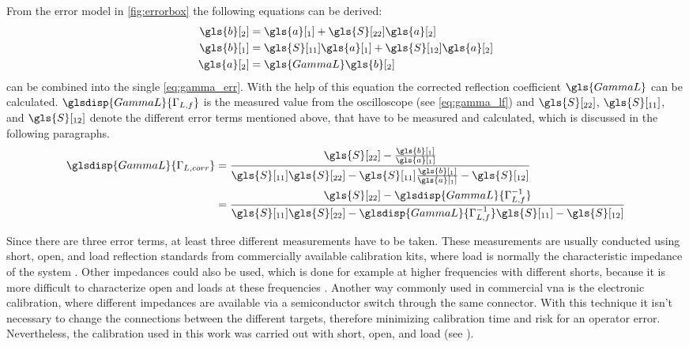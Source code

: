 \documentclass[12pt,a4paper,parskip=full,abstract=true,BCOR=12mm,twoside,open=right]{scrreprt}
\begin{document}
From the error model in \cref{fig:errorbox} the following equations can be derived:
\begin{align}
    \label{eq:b2} \gls{b}[_{2}] & = \gls{a}[_{1}] + \gls{S}[_{22}] \gls{a}[_{2}]\\
    \label{eq:b1} \gls{b}[_{1}] & = \gls{S}[_{11}] \gls{a}[_{1}] + \gls{S}[_{12}] \gls{a}[_{2}] \\
    \label{eq:a2} \gls{a}[_{2}] & = \gls{GammaL} \gls{b}[_{2}]
\end{align}
 can be combined into the single \cref{eq:gamma_err}.
With the help of this equation the corrected reflection coefficient $\gls{GammaL}$ can be calculated.
$\glsdisp{GammaL}{\Gamma_{L,f}}$ is the measured value from the oscilloscope (see \cref{eq:gamma_lf}) and $\gls{S}[_{22}]$, $\gls{S}[_{11}]$, and $\gls{S}[_{12}]$ denote the different
error terms mentioned above, that have to be measured and calculated, which is discussed in the following paragraphs.
\begin{equation}\label{eq:gamma_err}
    \begin{split}
        \glsdisp{GammaL}{\Gamma_{L,corr}} & = \frac{\gls{S}[_{22}] - \frac{\gls{b}[_1]}{\gls{a}[_1]}}{\gls{S}[_{11}] \gls{S}[_{22}] - \gls{S}[_{11}]\frac{\gls{b}[_1]}{\gls{a}[_1]} - \gls{S}[_{12}]} \\
        & = \frac{\gls{S}[_{22}] - \glsdisp{GammaL}{\Gamma_{L,f}^{-1}}}{\gls{S}[_{11}] \gls{S}[_{22}] - \glsdisp{GammaL}{\Gamma_{L,f}^{-1}}\gls{S}[_{11}] - \gls{S}[_{12}]}
    \end{split}
\end{equation}

Since there are three error terms, at least three different measurements have
to be taken. These measurements are usually conducted using short, open, and load reflection standards from commercially available calibration kits,
where load is normally the characteristic impedance of the system \cite{agilent_an_1287-3}.
Other impedances could also be used, which is done for example at higher frequencies
with different shorts, because it is more difficult to characterize open and
loads at these frequencies \cite{anritsu_cal}. Another way commonly used in
commercial \gls{vna} is the electronic calibration, where different impedances
are available via a semiconductor switch through the same connector. With this
technique it isn't necessary to change the connections between the different
targets, therefore minimizing calibration time and risk for an operator error.
Nevertheless, the calibration used in this work was carried out with short, open, and load (see
).
\end{document}
